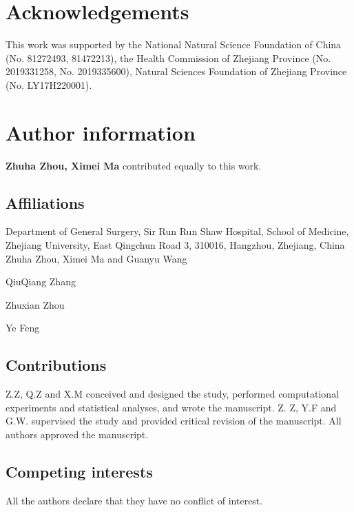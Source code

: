 \documentclass[fleqn,10pt]{wlscirep}
\begin{document}
\section*{Acknowledgements}
This work was supported by the National Natural Science Foundation of China (No. 81272493, 81472213), the Health Commission of Zhejiang Province (No. 2019331258, No. 2019335600), Natural Sciences Foundation of Zhejiang Province (No. LY17H220001).

\section*{Author information}
\textbf{Zhuha Zhou, Ximei Ma} contributed equally to this work.

\subsection*{Affiliations}
Department of General Surgery, Sir Run Run Shaw Hospital, School of Medicine, Zhejiang University, East Qingchun Road 3, 310016, Hangzhou, Zhejiang, China   Zhuha Zhou, Ximei Ma and Guanyu Wang

   QiuQiang Zhang

   Zhuxian Zhou

   Ye Feng

\subsection*{Contributions}
Z.Z, Q.Z and X.M conceived and designed the study, performed computational experiments and statistical analyses, and wrote the manuscript. Z. Z, Y.F and G.W. supervised the study and provided critical revision of the manuscript. All authors approved the manuscript.
\subsection*{Competing interests}
All the authors declare that they have no conflict of interest.
\end{document}
